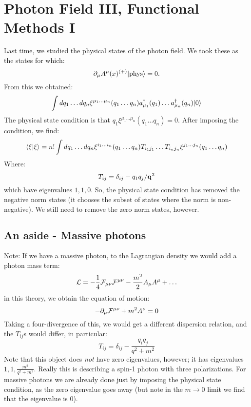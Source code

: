 \section{Photon Field III, Functional Methods I}
Last time, we studied the physical states of the photon field. We took these as the states for which:
\begin{equation}
    \partial_\mu A^\mu(x)^{(+)}\lvert \text{phys} \rangle = 0.
\end{equation}
From this we obtained:
\begin{equation}
    \int dq_1 \ldots dq_n \xi^{\mu_1 \ldots \mu_n}(q_1 \ldots q_n)a^\dagger_{\mu_1}(q_1) \ldots a^\dagger_{\mu_n}(q_n)\lvert 0 \rangle
\end{equation}
The physical state condition is that $q_1 \xi^{\mu_1 \ldots \mu_n}(q_1 \ldots q_n) = 0$. After imposing the condition, we find:
\begin{equation}
    \langle \xi \lvert \xi \rangle = n!\int dq_1 \ldots dq_n \xi^{i_1 \ldots i_n}(q_1 \ldots q_n)T_{i_1j_1} \ldots T_{i_nj_n}\xi^{j_1 \ldots j_n}(q_1 \ldots q_n)
\end{equation}
Where:
\begin{equation}
    T_{ij} = \delta_{ij} - q_1q_j/\mathbf{q}^2
\end{equation}
which have eigenvalues $1,1,0$. So, the physical state condition has removed the negative norm states (it chooses the subset of states where the norm is non-negative). We still need to remove the zero norm states, however.

\subsection{An aside - Massive photons}
Note: If we have a massive photon, to the Lagrangian density we would add a photon mass term:
\begin{equation}
    \mathcal{L} = -\frac{1}{4}\mathcal{F}_{\mu\nu}\mathcal{F}^{\mu\nu} - \frac{m^2}{2}A_\mu A^\mu + \ldots
\end{equation}
in this theory, we obtain the equation of motion:
\begin{equation}
    -\partial_\mu \mathcal{F}^{\mu\nu} + m^2A^\nu = 0
\end{equation}
Taking a four-divergence of this, we would get a different dispersion relation, and the $T_{ij}$s would differ, in particular:
\begin{equation}
    T_{ij} = \delta_{ij} - \frac{q_iq_j}{q^2+m^2}
\end{equation}
Note that this object does \emph{not} have zero eigenvalues, however; it has eigenvalues $1, 1, \frac{m^2}{q^2 + m^2}$. Really this is describing a spin-1 photon with three polarizations. For massive photons we are already done just by imposing the physical state condition, as the zero eigenvalue goes away (but note in the $m \to 0$ limit we find that the eigenvalue is 0). 

